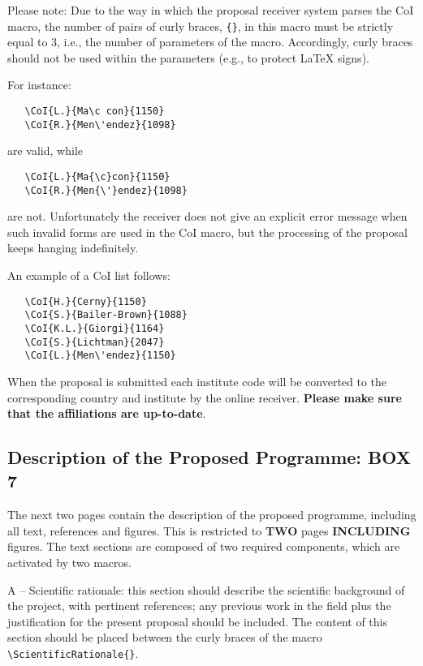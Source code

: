 \documentclass{article}
\begin{document}
Please note: Due to the way in which the proposal receiver system parses
the CoI macro, the number of pairs of curly braces, \verb|{}|,
in this macro must be strictly equal to 3, i.e., the
number of parameters of the macro. Accordingly, curly
braces should not be used within the parameters (e.g.,
to protect LaTeX signs).

\noindent
For instance:
\begin{verbatim}
   \CoI{L.}{Ma\c con}{1150}
   \CoI{R.}{Men\'endez}{1098}
\end{verbatim}

\noindent
are valid, while

\begin{verbatim}
   \CoI{L.}{Ma{\c}con}{1150}
   \CoI{R.}{Men{\'}endez}{1098}
\end{verbatim}

\noindent
are not. Unfortunately the receiver does not give an
explicit error message when such invalid forms are
used in the CoI macro, but the processing of the proposal
keeps hanging indefinitely.

\vspace{0.5cm}
An example of a CoI list follows:
\begin{verbatim}
   \CoI{H.}{Cerny}{1150}
   \CoI{S.}{Bailer-Brown}{1088}
   \CoI{K.L.}{Giorgi}{1164}
   \CoI{S.}{Lichtman}{2047}
   \CoI{L.}{Men\'endez}{1150}
\end{verbatim}

When the proposal is submitted each institute code will be converted to the
corresponding country and institute by the online receiver. {\bf Please make sure that the affiliations are up-to-date}.

\subsection{Description of the Proposed Programme: {\bf BOX 7}}

The next two pages contain the description of the proposed programme,
including all text, references and figures.
This is restricted to {\bf TWO} pages {\bf INCLUDING} figures. The
text sections are composed of two required components, which are 
activated by two macros.

A -- Scientific rationale: this section should describe the scientific
background of the project, with pertinent references; any previous
work in the field plus the justification for the present proposal
should be included.  The content of this section should be placed
between the curly braces of the macro \verb|\ScientificRationale{}|. 
\end{document}
